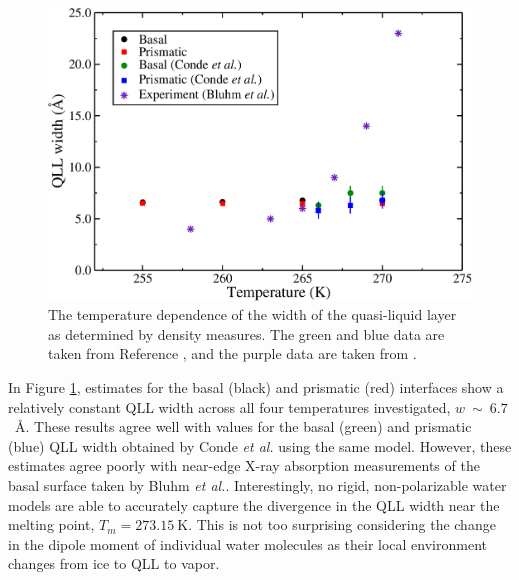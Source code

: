 \begin{figure}
\includegraphics[width=\linewidth]{Figures/qllWidthT}
\caption{\label{fig:qllWidth} The temperature dependence of the width
  of the quasi-liquid layer as determined by density measures. The
  green and blue data are taken from Reference \cite{Conde2008}, and
  the purple data are taken from \cite{Bluhm2002}. }
\end{figure}           

In Figure \ref{fig:qllWidth}, estimates for the basal (black) and
prismatic (red) interfaces show a relatively constant QLL width across
all four temperatures investigated, $w~\sim~6.7$~\AA. These results
agree well with values for the basal (green) and prismatic (blue) QLL
width obtained by Conde \textit{et al.} using the same
model.\cite{Conde2008} However, these estimates agree poorly with
near-edge X-ray absorption measurements of the basal surface taken by
Bluhm \textit{et al.}.\cite{Bluhm2002} Interestingly, no rigid,
non-polarizable water models are able to accurately capture the
divergence in the QLL width near the melting point,
$T_m = 273.15~\mathrm{K}$.\cite{Conde2008} This is not too surprising
considering the change in the dipole moment of individual water
molecules as their local environment changes from ice to QLL to vapor.

